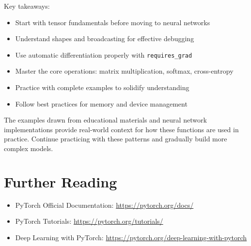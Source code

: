 \documentclass[11pt,a4paper]{book}
\begin{document}
Key takeaways:
\begin{itemize}
\item Start with tensor fundamentals before moving to neural networks
\item Understand shapes and broadcasting for effective debugging
\item Use automatic differentiation properly with \texttt{requires\_grad}
\item Master the core operations: matrix multiplication, softmax, cross-entropy
\item Practice with complete examples to solidify understanding
\item Follow best practices for memory and device management
\end{itemize}

The examples drawn from educational materials and neural network implementations provide real-world context for how these functions are used in practice. Continue practicing with these patterns and gradually build more complex models.

\section*{Further Reading}

\begin{itemize}
\item PyTorch Official Documentation: \url{https://pytorch.org/docs/}
\item PyTorch Tutorials: \url{https://pytorch.org/tutorials/}
\item Deep Learning with PyTorch: \url{https://pytorch.org/deep-learning-with-pytorch}
\end{itemize}
\end{document}
